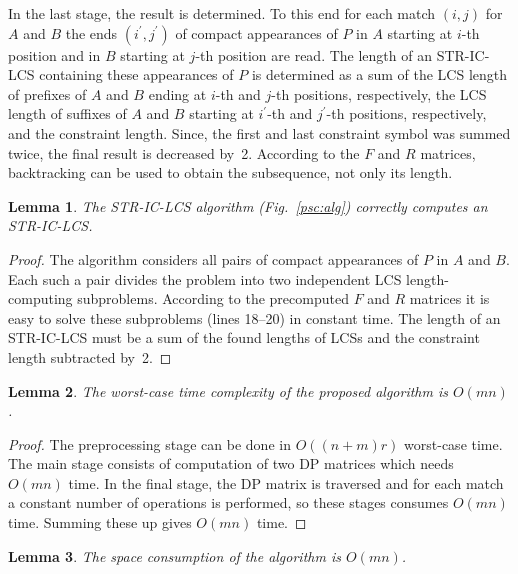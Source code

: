 \documentclass[12pt]{article}
\newtheorem{lemma}{Lemma}
\begin{document}
In the last stage, the result is determined.
To this end for each match $(i, j)$ for $A$ and $B$ the ends $(i^\prime, j^\prime)$ of compact appearances of $P$ in $A$ starting at $i$-th position and in $B$ starting at $j$-th position are read.
The length of an STR-IC-LCS containing these appearances of $P$ is determined as a sum of the LCS length of prefixes of $A$ and $B$ ending at $i$-th and $j$-th positions, respectively, the LCS length of suffixes of $A$ and $B$ starting at $i^\prime$-th and $j^\prime$-th positions, respectively, and the constraint length.
Since, the first and last constraint symbol was summed twice, the final result is decreased by~2.
According to the $F$ and $R$ matrices, backtracking can be used to obtain the subsequence, not only its length.

\begin{lemma}
The STR-IC-LCS algorithm (Fig.~\ref{psc:alg}) correctly computes an STR-IC-LCS.
\end{lemma}

\begin{proof}
The algorithm considers all pairs of compact appearances of $P$ in $A$ and $B$.
Each such a pair divides the problem into two independent LCS length-computing subproblems.
According to the precomputed $F$ and $R$ matrices it is easy to solve these subproblems (lines 18--20) in constant time.
The length of an STR-IC-LCS must be a sum of the found lengths of LCSs and the constraint length subtracted by~2.
\end{proof}

\begin{lemma}
The worst-case time complexity of the proposed algorithm is $O(mn)$.
\end{lemma}

\begin{proof}
The preprocessing stage can be done in $O((n+m)r)$ worst-case time.
The main stage consists of computation of two DP matrices which needs $O(mn)$ time.
In the final stage, the DP matrix is traversed and for each match a constant number of operations is performed, so these stages consumes $O(mn)$ time.
Summing these up gives $O(mn)$ time.
\end{proof}

\begin{lemma}
The space consumption of the algorithm is $O(mn)$.
\end{lemma}
\end{document}
